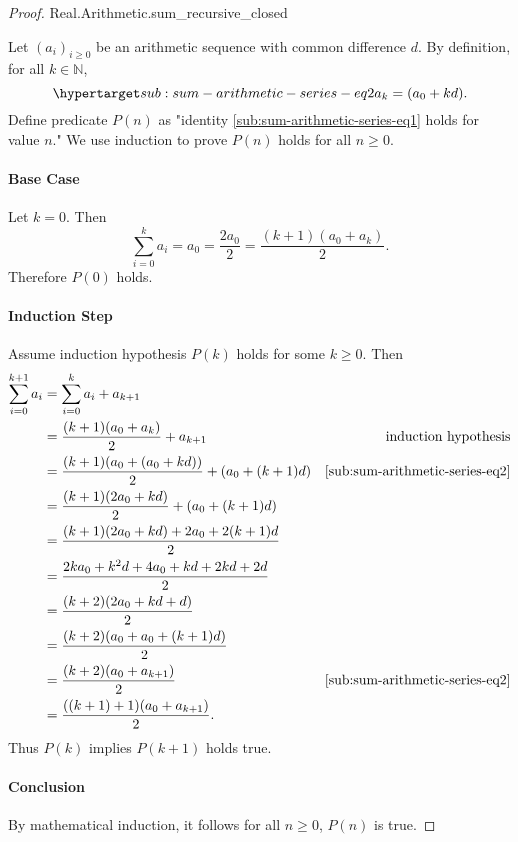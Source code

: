 \documentclass{article}
\begin{document}
\begin{proof}

    {Real.Arithmetic.sum\_recursive\_closed}

  Let $(a_i)_{i \geq 0}$ be an arithmetic sequence with common difference $d$.
  By definition, for all $k \in \mathbb{N}$,
    \begin{equation}
      \hyperlabel{sub:sum-arithmetic-series-eq2}
      a_k = (a_0 + kd).
    \end{equation}
  Define predicate $P(n)$ as "identity \eqref{sub:sum-arithmetic-series-eq1}
    holds for value $n$."
  We use induction to prove $P(n)$ holds for all $n \geq 0$.

  \paragraph{Base Case}%

    Let $k = 0$.
    Then $$\sum_{i=0}^k a_i = a_0 = \frac{2a_0}{2} =
      \frac{(k + 1)(a_0 + a_k)}{2}.$$
    Therefore $P(0)$ holds.

  \paragraph{Induction Step}%

    Assume induction hypothesis $P(k)$ holds for some $k \geq 0$.
    Then
      \begin{align*}
        \sum_{i=0}^{k+1} a_i
          & = \sum_{i=0}^k a_i + a_{k+1} \\
          & = \frac{(k + 1)(a_0 + a_k)}{2} + a_{k+1}
            & \text{induction hypothesis} \\
          & = \frac{(k + 1)(a_0 + (a_0 + kd))}{2} + (a_0 + (k + 1)d)
            & \eqref{sub:sum-arithmetic-series-eq2} \\
          & = \frac{(k + 1)(2a_0 + kd)}{2} + (a_0 + (k + 1)d) \\
          & = \frac{(k + 1)(2a_0 + kd) + 2a_0 + 2(k + 1)d}{2} \\
          & = \frac{2ka_0 + k^2d + 4a_0 + kd + 2kd + 2d}{2} \\
          & = \frac{(k + 2)(2a_0 + kd + d)}{2} \\
          & = \frac{(k + 2)(a_0 + a_0 + (k + 1)d)}{2} \\
          & = \frac{(k + 2)(a_0 + a_{k+1})}{2}
            & \eqref{sub:sum-arithmetic-series-eq2} \\
          & = \frac{((k + 1) + 1)(a_0 + a_{k+1})}{2}.
      \end{align*}
    Thus $P(k)$ implies $P(k + 1)$ holds true.

  \paragraph{Conclusion}%

    By mathematical induction, it follows for all $n \geq 0$, $P(n)$ is true.

\end{proof}
\end{document}
